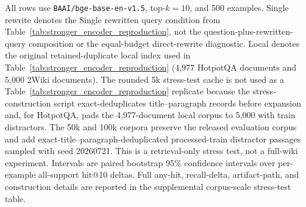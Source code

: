 \begin{table}[t]
\begin{threeparttable}
\begin{tablenotes}
\item All rows use \texttt{BAAI/bge-base-en-v1.5}, top-$k=10$, and 500 examples. Single rewrite denotes the Single rewritten query condition from Table~\ref{tab:stronger_encoder_reproduction}, not the question-plus-rewritten-query composition or the equal-budget direct-rewrite diagnostic. Local denotes the original retained-duplicate local index used in Table~\ref{tab:stronger_encoder_reproduction} (4,977 HotpotQA documents and 5,000 2Wiki documents). The rounded 5k stress-test cache is not used as a Table~\ref{tab:stronger_encoder_reproduction} replicate because the stress-construction script exact-deduplicates title--paragraph records before expansion and, for HotpotQA, pads the 4,977-document local corpus to 5,000 with train distractors. The 50k and 100k corpora preserve the released evaluation corpus and add exact-title--paragraph-deduplicated processed-train distractor passages sampled with seed 20260721. This is a retrieval-only stress test, not a full-wiki experiment. Intervals are paired bootstrap 95\% confidence intervals over per-example all-support hit@10 deltas. Full any-hit, recall-delta, artifact-path, and construction details are reported in the supplemental corpus-scale stress-test table.
\end{tablenotes}
\end{threeparttable}
\end{table}
